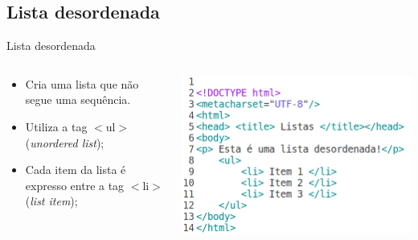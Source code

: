 \documentclass{beamer}
\begin{document}
\subsection{Lista desordenada}
\begin{frame}{Lista desordenada}
  \begin{columns}
    \begin{column}{0.45 \textwidth}
     \begin{itemize}
      \item Cria uma lista que não segue uma sequência.
       \item Utiliza a tag $<$ul$>$ (\textit{unordered list});
       \item Cada item da lista é expresso entre a tag $<$li$>$ 
      (\textit{list item});
     \end{itemize}
    \end{column}
    \begin{column}{0.5\textwidth}
     \includegraphics[height=0.45\paperheight]{fig/aula1/html3.png}
    \end{column}
  \end{columns}
\end{frame}
\end{document}
